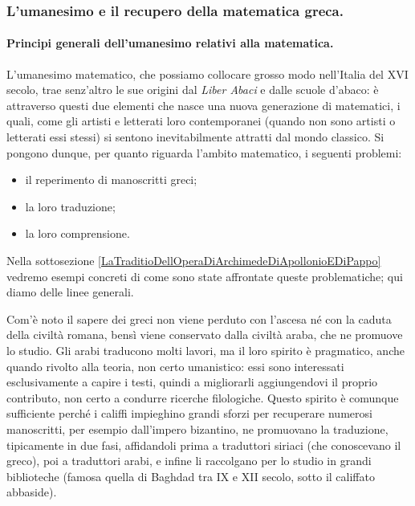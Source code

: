 \subsubsection{L'umanesimo e il recupero della matematica greca.}\label{LUmanesimoEIlRecuperoDellaMatematicaGreca}
\paragraph{Principi generali dell'umanesimo relativi alla matematica.} L'umanesimo matematico, che possiamo collocare grosso modo nell'Italia del XVI secolo, trae senz'altro le sue origini dal \textit{Liber Abaci} e dalle scuole d'abaco: \`e attraverso questi due elementi che nasce una nuova generazione di matematici, i quali, come gli artisti e letterati loro contemporanei (quando non sono artisti o letterati essi stessi) si sentono inevitabilmente attratti dal mondo classico. Si pongono dunque, per quanto riguarda l'ambito matematico, i seguenti problemi:
\begin{itemize}
	\item il reperimento di manoscritti greci;
	\item la loro traduzione;
	\item la loro comprensione.
\end{itemize}
\par Nella sottosezione \ref{LaTraditioDellOperaDiArchimedeDiApollonioEDiPappo} vedremo esempi concreti di come sono state affrontate queste problematiche; qui diamo delle linee generali.
\par Com'\`e noto il sapere dei greci non viene perduto con l'ascesa n\'e con la caduta della civilt\`a romana, bens\`i viene conservato dalla civilt\`a araba, che ne promuove lo studio. Gli arabi traducono molti lavori, ma il loro spirito \`e pragmatico, anche quando rivolto alla teoria, non certo umanistico: essi sono interessati esclusivamente a capire i testi, quindi a migliorarli aggiungendovi il proprio contributo, non certo a condurre ricerche filologiche. Questo spirito \`e comunque sufficiente perch\'e i califfi impieghino grandi sforzi per recuperare numerosi manoscritti, per esempio dall'impero bizantino, ne promuovano la traduzione, tipicamente in due fasi, affidandoli prima a traduttori siriaci (che conoscevano il greco), poi a traduttori arabi, e infine li raccolgano per lo studio in grandi biblioteche (famosa quella di Baghdad tra IX e XII secolo, sotto il califfato abbaside).
